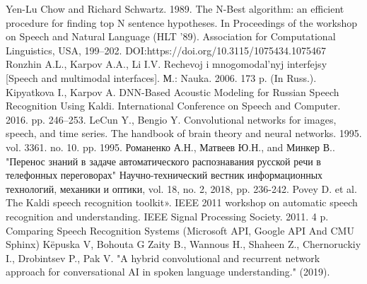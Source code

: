 \documentclass[conference]{IEEEtran}
\begin{document}
\begin{thebibliography}{00}
 Yen-Lu Chow and Richard Schwartz. 1989. The N-Best algorithm: an efficient procedure for finding top N sentence hypotheses. In Proceedings of the workshop on Speech and Natural Language (HLT ’89). Association for Computational Linguistics, USA, 199–202. DOI:https://doi.org/10.3115/1075434.1075467
 Ronzhin A.L., Karpov A.A., Li I.V. Rechevoj i mnogomodal'nyj interfejsy [Speech and multimodal interfaces]. М.: Nauka. 2006. 173 p. (In Russ.).
 Kipyatkova I., Karpov A. DNN-Based Acoustic Modeling for Russian Speech Recognition Using Kaldi. International Conference on Speech and Computer. 2016. pp. 246–253.
 LeCun Y., Bengio Y. Convolutional networks for images, speech, and time series. The handbook of brain theory and neural networks. 1995. vol. 3361. no. 10. pp. 1995.
 Романенко А.Н., Матвеев Ю.Н., and Минкер В.. "Перенос знаний в задаче автоматического распознавания русской речи в телефонных переговорах" Научно-технический вестник информационных технологий, механики и оптики, vol. 18, no. 2, 2018, pp. 236-242.
 Povey D. et al. The Kaldi speech recognition toolkit». IEEE 2011 workshop on automatic speech recognition and understanding. IEEE Signal Processing Society. 2011. 4 p.
 Comparing Speech Recognition Systems (Microsoft API, Google API And CMU Sphinx) Këpuska V, Bohouta G
 Zaity B., Wannous H., Shaheen Z., Chernoruckiy I., Drobintsev P., Pak V. "A hybrid convolutional and recurrent network approach for conversational AI in spoken language understanding." (2019).

\end{thebibliography}
\vspace{12pt}
\end{document}
